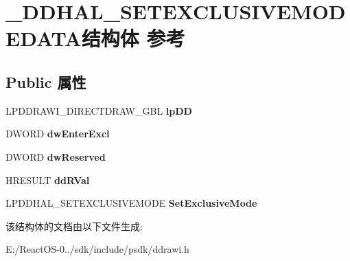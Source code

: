 \hypertarget{struct___d_d_h_a_l___s_e_t_e_x_c_l_u_s_i_v_e_m_o_d_e_d_a_t_a}{}\section{\+\_\+\+D\+D\+H\+A\+L\+\_\+\+S\+E\+T\+E\+X\+C\+L\+U\+S\+I\+V\+E\+M\+O\+D\+E\+D\+A\+T\+A结构体 参考}
\label{struct___d_d_h_a_l___s_e_t_e_x_c_l_u_s_i_v_e_m_o_d_e_d_a_t_a}
\subsection*{Public 属性}
\begin{DoxyCompactItemize}
\item 
\mbox{\label{struct___d_d_h_a_l___s_e_t_e_x_c_l_u_s_i_v_e_m_o_d_e_d_a_t_a_a741d343c7d6a06bbd5b55db520ae8f61}} 
L\+P\+D\+D\+R\+A\+W\+I\+\_\+\+D\+I\+R\+E\+C\+T\+D\+R\+A\+W\+\_\+\+G\+BL {\bfseries lp\+DD}
\item 
\mbox{\label{struct___d_d_h_a_l___s_e_t_e_x_c_l_u_s_i_v_e_m_o_d_e_d_a_t_a_acf8d30f6f9391dbbe0b8d0cb9b7bfeb1}} 
D\+W\+O\+RD {\bfseries dw\+Enter\+Excl}
\item 
\mbox{\label{struct___d_d_h_a_l___s_e_t_e_x_c_l_u_s_i_v_e_m_o_d_e_d_a_t_a_a13003a3650c993a3ad87940b1cef29e3}} 
D\+W\+O\+RD {\bfseries dw\+Reserved}
\item 
\mbox{\label{struct___d_d_h_a_l___s_e_t_e_x_c_l_u_s_i_v_e_m_o_d_e_d_a_t_a_af31861dbcbcebaa5158f4d78ba94989f}} 
H\+R\+E\+S\+U\+LT {\bfseries dd\+R\+Val}
\item 
\mbox{\label{struct___d_d_h_a_l___s_e_t_e_x_c_l_u_s_i_v_e_m_o_d_e_d_a_t_a_aa847f2d916656b17c55659785b704411}} 
L\+P\+D\+D\+H\+A\+L\+\_\+\+S\+E\+T\+E\+X\+C\+L\+U\+S\+I\+V\+E\+M\+O\+DE {\bfseries Set\+Exclusive\+Mode}
\end{DoxyCompactItemize}


该结构体的文档由以下文件生成\+:\begin{DoxyCompactItemize}
\item 
E\+:/\+React\+O\+S-\/0../sdk/include/psdk/ddrawi.\+h\end{DoxyCompactItemize}
